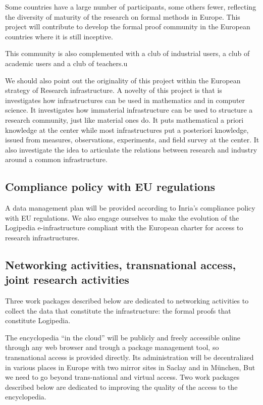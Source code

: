 Some countries have a large number of participants, some others fewer,
reflecting the diversity of maturity of the research on formal methods
in Europe. This project will contribute to develop the formal proof
community in the European countries where it is still inceptive.

This community is also complemented with a club of industrial users, a club
of academic users and a club of teachers.u

We should also point out the originality of this project within the
European strategy of Research infrastructure. A novelty of this
project is that is investigates how infrastructures can be used in
mathematics and in computer science. It investigates how immaterial
infrastructure can be used to structure a research community, just
like material ones do. It puts mathematical a priori knowledge at the
center while most infrastructures put a posteriori knowledge, issued
from measures, observations, experiments, and field survey at the
center. It also investigate the idea to articulate the relations
between research and industry around a common infrastructure.

\subsection{Compliance policy with EU regulations}

A data management plan will be provided according to Inria’s
compliance policy with EU regulations. We also engage ourselves to
make the evolution of the {\sf Logipedia} e-infrastructure compliant
with the European charter for access to research infrastructures.

\subsection{Networking activities, transnational access, joint
  research activities}

Three work packages described below are dedicated to networking activities
to collect the data that constitute the infrastructure: the formal proofs
that constitute {\sf Logipedia}.


The encyclopedia ``in the cloud'' will be publicly and freely
accessible online through any web browser and trough a package
management tool, so transnational access is provided directly. Its
administration will be decentralized in various places in Europe with
two mirror sites in Saclay and in M\"unchen, But we need to go beyond
trans-national and virtual access.  Two work packages described below
are dedicated to improving the quality of the access to the
encyclopedia.

